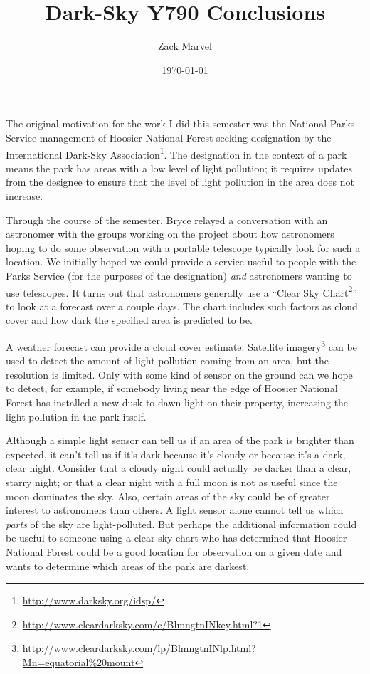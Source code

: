 \documentclass{article}
\title{Dark-Sky Y790 Conclusions}
\author{Zack Marvel}
\date{\today}
\begin{document}
\maketitle

The original motivation for the work I did this semester was the National Parks Service management of Hoosier National Forest seeking designation by the International Dark-Sky Association\footnote{\url{http://www.darksky.org/idsp/}}. The designation in the context of a park means the park has areas with a low level of light pollution; it requires updates from the designee to ensure that the level of light pollution in the area does not increase.

Through the course of the semester, Bryce relayed a conversation with an astronomer with the groups working on the project about how astronomers hoping to do some observation with a portable telescope typically look for such a location. We initially hoped we could provide a service useful to people with the Parks Service (for the purposes of the designation) \emph{and} astronomers wanting to use telescopes. It turns out that astronomers generally use a ``Clear Sky Chart\footnote{\url{http://www.cleardarksky.com/c/BlmngtnINkey.html?1}}'' to look at a forecast over a couple days. The chart includes such factors as cloud cover and how dark the specified area is predicted to be.

A weather forecast can provide a cloud cover estimate. Satellite imagery\footnote{\url{http://www.cleardarksky.com/lp/BlmngtnINlp.html?Mn=equatorial\%20mount}} can be used to detect the amount of light pollution coming from an area, but the resolution is limited. Only with some kind of sensor on the ground can we hope to detect, for example, if somebody living near the edge of Hoosier National Forest has installed a new dusk-to-dawn light on their property, increasing the light pollution in the park itself.

Although a simple light sensor can tell us if an area of the park is brighter than expected, it can't tell us if it's dark because it's cloudy or because it's a dark, clear night. Consider that a cloudy night could actually be darker than a clear, starry night; or that a clear night with a full moon is not as useful since the moon dominates the sky. Also, certain areas of the sky could be of greater interest to astronomers than others. A light sensor alone cannot tell us which \emph{parts} of the sky are light-polluted. But perhaps the additional information could be useful to someone using a clear sky chart who has determined that Hoosier National Forest could be a good location for observation on a given date and wants to determine which areas of the park are darkest.
\end{document}
